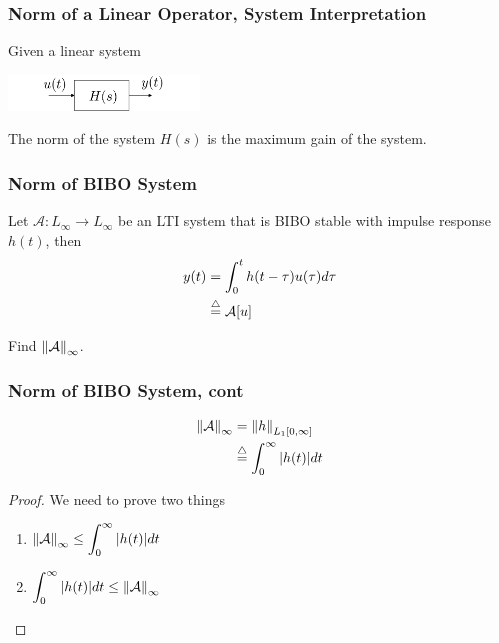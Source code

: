 \documentclass{beamer}
\begin{document}
\begin{frame}\frametitle{Norm of a Linear Operator, System Interpretation}
	Given a linear system
	\begin{center}
		\includegraphics[width=2in]{figures/chap4_linear_system}	
	\end{center}

	\vfill
	
	The norm of the system $H(s)$ is the maximum gain of the system.
\end{frame}

\begin{frame}\frametitle{Norm of BIBO System}
	Let $\mathcal{A}: L_{\infty} \to L_{\infty}$ be an LTI system that is BIBO stable with impulse response $h(t)$, then
	\begin{align*}
	y(t) &= \int_0^t h(t-\tau)u(\tau)d\tau \\
		&\stackrel{\triangle}{=} \mathcal{A}[u] 
	\end{align*}
	
	\vfill
	
	Find $\left\|\mathcal{A}\right\|_{\infty}$.
\end{frame}

\begin{frame}\frametitle{Norm of BIBO System, cont}
	\begin{lemma}
	\begin{align*}
	\left\|\mathcal{A}\right\|_{\infty} &= \left\|h\right\|_{L_1[0,\infty]} \\
		&\stackrel{\triangle}{=} \int_0^{\infty} |h(t)|dt 
	\end{align*}
	\end{lemma}
	
	\begin{proof}
		We need to prove two things
		\begin{enumerate}
		\item $\left\|\mathcal{A}\right\|_{\infty} \leq \displaystyle\int_0^{\infty} |h(t)|dt$
		\item $\displaystyle\int_0^{\infty}|h(t)|dt \leq \left\|\mathcal{A}\right\|_{\infty}$
		\end{enumerate}
	\end{proof}
\end{frame}
\end{document}
